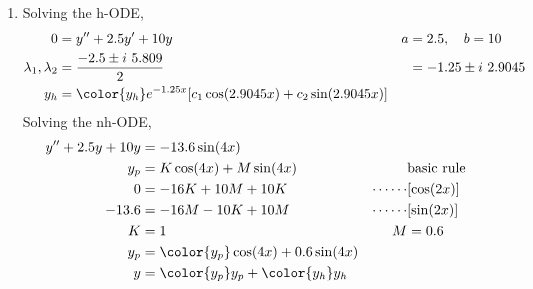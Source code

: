 \begin{enumerate}
    \item Solving the h-ODE,
          \begin{align}
              0                        & = y'' + 2.5y' + 10y                                                   & a & = 2.5, \quad b = 10   \\
              \lambda_{1}, \lambda_{2} & = \frac{-2.5 \pm i\ 5.809}{2}                                         &   & = -1.25 \pm i\ 2.9045 \\
              y_{h}                    & = \color{y_h} e^{-1.25x}[c_{1} \cos(2.9045 x) + c_{2} \sin(2.9045 x)]
          \end{align}
          Solving the nh-ODE,
          \begin{align}
              y'' + 2.5y + 10y & = -13.6 \sin(4x)                                                               \\
              y_{p}            & = K \cos(4x) + M \sin(4x)                   &              & \text{basic rule} \\
              0                & = -16K + 10M + 10K                          & \cdots\cdots & [\cos(2x)]        \\
              -13.6            & = -16M - 10K + 10M                          & \cdots\cdots & [\sin(2x)]        \\
              K                & = 1                                         & M            & = 0.6             \\
              y_{p}            & = \color{y_p} \cos(4x) + 0.6 \sin(4x)                                          \\
              y                & = {\color{y_p} y_{p}} + {\color{y_h} y_{h}}
          \end{align}


\end{enumerate}
